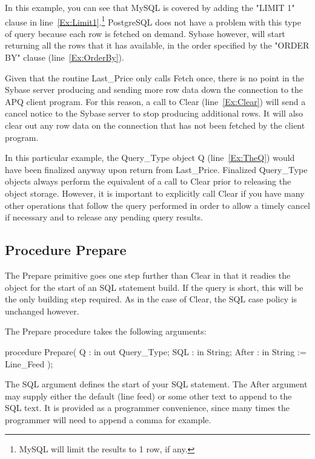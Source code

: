 \documentclass[english,letterpaper]{book}
\begin{document}
In this example, you can see that MySQL is covered by adding the "LIMIT 1"
clause in line~\ref{Ex:Limit1}.\footnote{MySQL will limit the results to 1 row, if any.}
PostgreSQL does not have a problem with this type of query because each row is
fetched on demand. Sybase however, will start returning all the rows
that it has available, in the order specified by the "ORDER BY" clause
(line~\ref{Ex:OrderBy}).

Given that the routine Last\_Price only calls Fetch
once, there is no point in the Sybase server producing and sending
more row data down the connection to the APQ client program. For this
reason, a call to Clear (line~\ref{Ex:Clear}) will send a cancel notice to the Sybase server
to stop producing additional rows. It will also clear out any row data on
the connection that has not been fetched by the client program.

In this particular example, the Query\_Type object Q (line~\ref{Ex:TheQ}) would have been
finalized anyway upon return from Last\_Price. Finalized Query\_Type
objects always perform the equivalent of a call to Clear prior to
releasing the object storage. However, it is important to explicitly
call Clear if you have many other operations that follow the query
performed in order to allow a timely cancel if necessary and to release
any pending query results.


\subsection{Procedure Prepare\label{Procedure Prepare}}

The Prepare primitive goes one step further than Clear
in that it readies the object for the start of an SQL statement build.
If the query is short, this will be the only building step required.
As in the case of Clear, the SQL case policy is unchanged however.

The Prepare procedure takes the following arguments:

\begin{Code}
procedure Prepare(
   Q :     in out Query_Type;
   SQL :   in     String;
   After : in     String := Line_Feed
);
\end{Code}

The SQL argument defines the start of your SQL statement. The
After argument may supply either the default (line feed) or
some other text to append to the SQL text.
It is provided as a programmer convenience, since many times the
programmer will need to append a comma for example.
\end{document}
